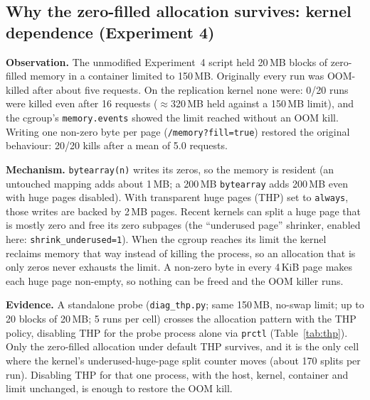 \documentclass[conference]{IEEEtran}
\begin{document}
\subsection{Why the zero-filled allocation survives: kernel dependence (Experiment 4)}
\label{sec:oomkernel}
\textbf{Observation.} The unmodified Experiment~4 script held 20\,MB blocks of
zero-filled memory in a container limited to 150\,MB. Originally every run was
OOM-killed after about five requests. On the replication kernel none were: 0/20
runs were killed even after 16 requests ($\approx$320\,MB held against a
150\,MB limit), and the cgroup's \texttt{memory.events} showed the limit reached
without an OOM kill. Writing one non-zero byte per page
(\texttt{/memory?fill=true}) restored the original behaviour: 20/20 kills after a mean of
5.0 requests.

\textbf{Mechanism.} \texttt{bytearray(n)} writes its zeros, so the memory is resident
(an untouched mapping adds about 1\,MB; a 200\,MB \texttt{bytearray} adds 200\,MB even
with huge pages disabled). With transparent huge pages (THP) set to \texttt{always},
those writes are backed by 2\,MB pages. Recent kernels can split a huge page that is
mostly zero and free its zero subpages (the ``underused page'' shrinker, enabled here:
\texttt{shrink\_underused=1}). When the cgroup reaches its limit the kernel reclaims
memory that way instead of killing the process, so an allocation that is only zeros
never exhausts the limit. A non-zero byte in every 4\,KiB page makes each huge page
non-empty, so nothing can be freed and the OOM killer runs.

\textbf{Evidence.} A standalone probe (\texttt{diag\_thp.py}; same 150\,MB, no-swap
limit; up to 20 blocks of 20\,MB; 5 runs per cell) crosses the allocation pattern with
the THP policy, disabling THP for the probe process alone via \texttt{prctl}
(Table~\ref{tab:thp}). Only the zero-filled allocation under default THP survives, and
it is the only cell where the kernel's underused-huge-page split counter moves
(about 170 splits per run). Disabling THP for that one process, with the host, kernel,
container and limit unchanged, is enough to restore the OOM kill.

\begin{table}[t]
\centering
\caption{Experiment~4 diagnostic: allocation pattern against THP policy for the
probe process (5 runs per row; 20 blocks of 20\,MB at most, 150\,MB limit).
\emph{Blocks} is the median number of blocks reached; \emph{THP splits} is the range of
the host's \texttt{thp\_underused\_split\_page} counter delta per run.}
\label{tab:thp}
\small

\end{table}
\end{document}
